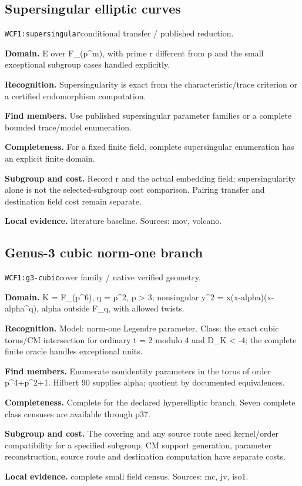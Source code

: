 \documentclass[10pt]{article}
\begin{document}
\subsection{Supersingular elliptic curves}
\texttt{WCF1:supersingular}\quad conditional transfer / published reduction.\par
\textbf{Domain.} E over F\_(p\textasciicircum{}m), with prime r different from p and the small exceptional subgroup cases handled explicitly.\par
\textbf{Recognition.} Supersingularity is exact from the characteristic/trace criterion or a certified endomorphism computation.\par
\textbf{Find members.} Use published supersingular parameter families or a complete bounded trace/model enumeration.\par
\textbf{Completeness.} For a fixed finite field, complete supersingular enumeration has an explicit finite domain.\par
\textbf{Subgroup and cost.} Record r and the actual embedding field; supersingularity alone is not the selected-subgroup cost comparison. Pairing transfer and destination field cost remain separate.\par
\textbf{Local evidence.} literature baseline. Sources: mov, volcano.
\subsection{Genus-3 cubic norm-one branch}
\texttt{WCF1:g3-cubic}\quad cover family / native verified geometry.\par
\textbf{Domain.} K = F\_(p\textasciicircum{}6), q = p\textasciicircum{}2, p > 3; nonsingular y\textasciicircum{}2 = x(x-alpha)(x-alpha\textasciicircum{}q), alpha outside F\_q, with allowed twists.\par
\textbf{Recognition.} Model: norm-one Legendre parameter. Class: the exact cubic torus/CM intersection for ordinary t = 2 modulo 4 and D\_K < -4; the complete finite oracle handles exceptional units.\par
\textbf{Find members.} Enumerate nonidentity parameters in the torus of order p\textasciicircum{}4+p\textasciicircum{}2+1. Hilbert 90 supplies alpha; quotient by documented equivalences.\par
\textbf{Completeness.} Complete for the declared hyperelliptic branch. Seven complete class censuses are available through p37.\par
\textbf{Subgroup and cost.} The covering and any source route need kernel/order compatibility for a specified subgroup. CM support generation, parameter reconstruction, source route and destination computation have separate costs.\par
\textbf{Local evidence.} complete small field census. Sources: mc, jv, iso1.
\end{document}
